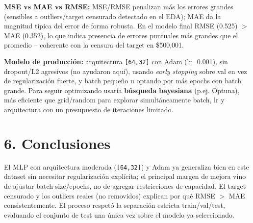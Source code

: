\documentclass[9pt]{extarticle}
\begin{document}
\textbf{MSE vs MAE vs RMSE:} MSE/RMSE penalizan más los errores grandes (sensibles a outliers/target censurado detectado en el EDA); MAE da la magnitud típica del error de forma robusta. En el modelo final RMSE (0.525) $>$ MAE (0.352), lo que indica presencia de errores puntuales más grandes que el promedio -- coherente con la censura del target en \$500,001.

\textbf{Modelo de producción:} arquitectura \texttt{[64,32]} con Adam (lr=0.001), sin dropout/L2 agresivos (no ayudaron aquí), usando \emph{early stopping} sobre val en vez de regularización fuerte, y batch pequeño u optando por más epochs con batch grande. Para seguir optimizando usaría \textbf{búsqueda bayesiana} (p.ej. Optuna), más eficiente que grid/random para explorar simultáneamente batch, lr y arquitectura con un presupuesto de iteraciones limitado.

\section*{6. Conclusiones}
El MLP con arquitectura moderada (\texttt{[64,32]}) y Adam ya generaliza bien en este dataset sin necesitar regularización explícita; el principal margen de mejora vino de ajustar batch size/epochs, no de agregar restricciones de capacidad. El target censurado y los outliers reales (no removidos) explican por qué RMSE $>$ MAE consistentemente. El proceso respetó la separación estricta train/val/test, evaluando el conjunto de test una única vez sobre el modelo ya seleccionado.
\end{document}
